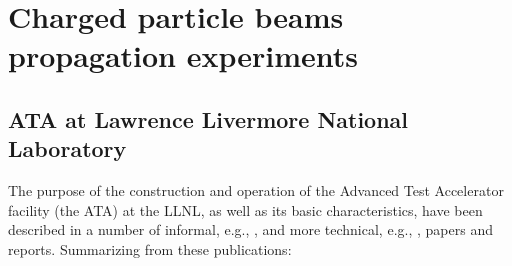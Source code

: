 \documentclass [12pt,a4paper,     ]{report} %
\begin{document}
\chapter{Charged particle beams propagation experiments}
\label{cpb:0}


\section{ATA at Lawrence Livermore National Laboratory}
\label{ata:0}


The purpose of the construction and operation of the Advanced Test Accelerator facility (the ATA) at the LLNL, as well as its basic characteristics, have been described in a number of informal, e.g., \cite{LLNL1978-, BARLE1981A, BARLE1981B, B.M.S1982-}, and more technical, e.g.,  \cite{COOK-1983-, JACKS1983-, REGIN1983-}, papers and reports.  Summarizing from these publications:
\end{document}
